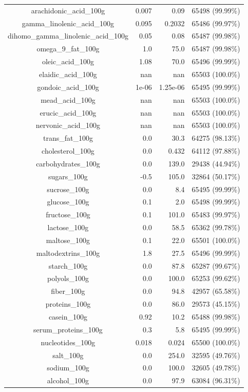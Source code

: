 \documentclass[11pt]{article}
\begin{document}
\begin{center}
\begin{longtable}{|c|r|r|r|}
arachidonic\_acid\_100g& 0.007& 0.09& 65498 (99.99\%)\\
gamma\_linolenic\_acid\_100g& 0.095& 0.2032& 65486 (99.97\%)\\
dihomo\_gamma\_linolenic\_acid\_100g& 0.05& 0.08& 65487 (99.98\%)\\
omega\_9\_fat\_100g& 1.0& 75.0& 65487 (99.98\%)\\
oleic\_acid\_100g& 1.08& 70.0& 65496 (99.99\%)\\
elaidic\_acid\_100g& nan& nan& 65503 (100.0\%)\\
gondoic\_acid\_100g& 1e-06& 1.25e-06& 65495 (99.99\%)\\
mead\_acid\_100g& nan& nan& 65503 (100.0\%)\\
erucic\_acid\_100g& nan& nan& 65503 (100.0\%)\\
nervonic\_acid\_100g& nan& nan& 65503 (100.0\%)\\
trans\_fat\_100g& 0.0& 30.3& 64275 (98.13\%)\\
cholesterol\_100g& 0.0& 0.432& 64112 (97.88\%)\\
carbohydrates\_100g& 0.0& 139.0& 29438 (44.94\%)\\
sugars\_100g& -0.5& 105.0& 32864 (50.17\%)\\
sucrose\_100g& 0.0& 8.4& 65495 (99.99\%)\\
glucose\_100g& 0.1& 2.0& 65498 (99.99\%)\\
fructose\_100g& 0.1& 101.0& 65483 (99.97\%)\\
lactose\_100g& 0.0& 58.5& 65362 (99.78\%)\\
maltose\_100g& 0.1& 22.0& 65501 (100.0\%)\\
maltodextrins\_100g& 1.8& 27.5& 65496 (99.99\%)\\
starch\_100g& 0.0& 87.8& 65287 (99.67\%)\\
polyols\_100g& 0.0& 100.0& 65253 (99.62\%)\\
fiber\_100g& 0.0& 94.8& 42957 (65.58\%)\\
proteins\_100g& 0.0& 86.0& 29573 (45.15\%)\\
casein\_100g& 0.92& 10.2& 65488 (99.98\%)\\
serum\_proteins\_100g& 0.3& 5.8& 65495 (99.99\%)\\
nucleotides\_100g& 0.018& 0.024& 65500 (100.0\%)\\
salt\_100g& 0.0& 254.0& 32595 (49.76\%)\\
sodium\_100g& 0.0& 100.0& 32605 (49.78\%)\\
alcohol\_100g& 0.0& 97.9& 63084 (96.31\%)\\

\end{longtable}
\end{center}
\end{document}
